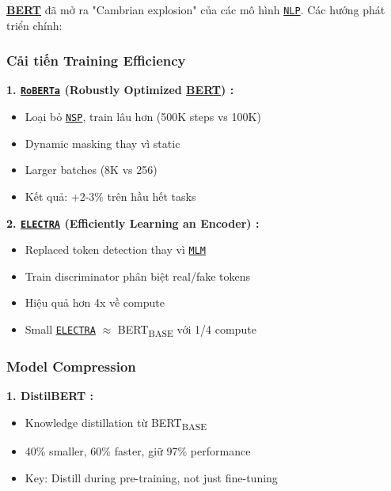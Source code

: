     \hyperref[acro:bert]{\textbf{BERT}} đã mở ra "Cambrian explosion" của các mô hình \hyperref[acro:nlp]{\texttt{NLP}}. Các hướng phát triển chính:
    
    \subsubsection{Cải tiến Training Efficiency}
    
    \textbf{1. \hyperref[acro:roberta]{\texttt{RoBERTa}} (Robustly Optimized \hyperref[acro:bert]{\textbf{BERT}}) \cite{liu2019roberta}:}
    \begin{itemize}
        \item Loại bỏ \hyperref[acro:nsp]{\texttt{NSP}}, train lâu hơn (500K steps vs 100K)
        \item Dynamic masking thay vì static
        \item Larger batches (8K vs 256)
        \item Kết quả: +2-3\% trên hầu hết tasks
    \end{itemize}
    
    \textbf{2. \hyperref[acro:electra]{\texttt{ELECTRA}} (Efficiently Learning an Encoder) \cite{clark2020electra}:}
    \begin{itemize}
        \item Replaced token detection thay vì \hyperref[acro:mlm]{\texttt{MLM}}
        \item Train discriminator phân biệt real/fake tokens
        \item Hiệu quả hơn 4x về compute
        \item Small \hyperref[acro:electra]{\texttt{ELECTRA}} $\approx$ BERT\textsubscript{BASE} với 1/4 compute
    \end{itemize}
    
    \subsubsection{Model Compression}
    
    \textbf{1. DistilBERT \cite{sanh2019distilbert}:}
    \begin{itemize}
        \item Knowledge distillation từ BERT\textsubscript{BASE}
        \item 40\% smaller, 60\% faster, giữ 97\% performance
        \item Key: Distill during pre-training, not just fine-tuning
    \end{itemize}
    

